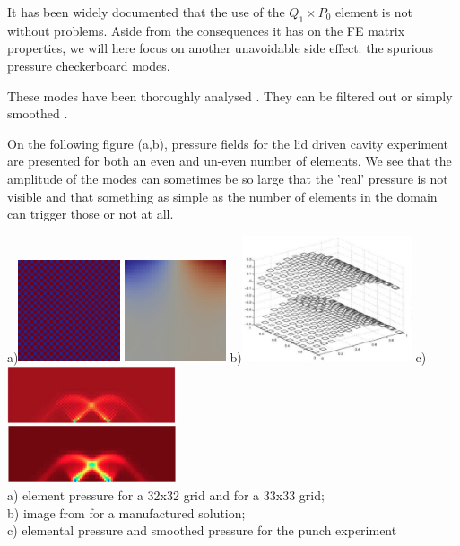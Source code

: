 
It has been widely documented that the use of the $Q_1 \times P_0$ element is not without problems. Aside from the 
consequences it has on the FE matrix properties, we will here focus on another unavoidable side effect: the spurious pressure 
checkerboard modes.  

These modes have been thoroughly analysed \cite{grsi94,chpc95,sagl81a,sagl81b}.
They can be filtered out \cite{chpc95} or simply smoothed \cite{legs79}.

On the following figure (a,b), pressure fields for the lid driven cavity experiment 
are presented for both an even and un-even number of elements. We see that 
the amplitude of the modes can sometimes be so large that the 'real' pressure is 
not visible and that something as simple as the number of elements in the 
domain can trigger those or not at all.

\begin{center}
a)\includegraphics[width=3cm]{images/checkerboard/p_el}
\includegraphics[width=3cm]{images/checkerboard/p_el_33x33}
b)\includegraphics[width=5cm]{images/checkerboard/press_doneahuerta}
c)\includegraphics[width=5cm]{images/checkerboard/douarpunch}\\
{\small a) element pressure for a 32x32 grid and for a 33x33 grid;\\ 
b) image from \cite[p307]{dohu03} for a manufactured solution;\\ 
c) elemental pressure and smoothed pressure for the punch experiment \cite{thfb08}}
\end{center}

